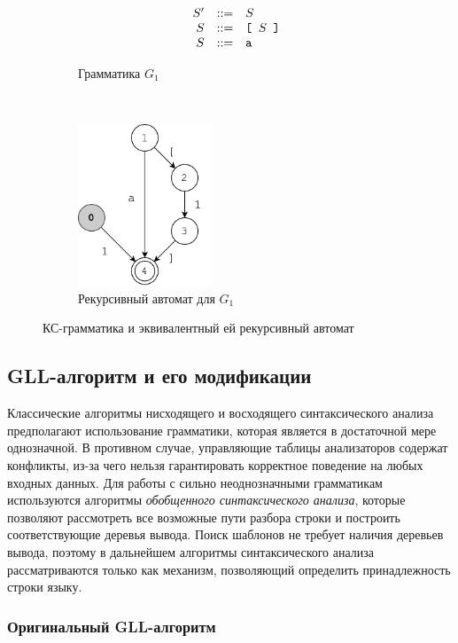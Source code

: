 \begin{figure}[h]
	\centering
	\begin{subfigure}[b]{0.45\textwidth}
		\centering
		$$
		\begin{array}{crcl}
		&S' & ::= & S \\
		&S  & ::= & \texttt{[ } S \texttt{ ]}\\
		&S  & ::= & \mbox{\texttt{a}}
		\end{array}
		$$
		\caption{Грамматика $G_1$}
	\end{subfigure}
	~
	\begin{subfigure}[b]{0.45\textwidth}
		\centering
		\includegraphics[width=4cm]{pictures/ra_example.pdf}
		\caption{Рекурсивный автомат для $G_1$}
	\end{subfigure}
	\caption{КС-грамматика и эквивалентный ей рекурсивный автомат}
	\label{fig:ra_ex}
\end{figure}

\subsection{GLL-алгоритм и его модификации}

Классические алгоритмы нисходящего и восходящего синтаксического анализа предполагают использование грамматики, которая является в достаточной мере однозначной. 
В противном случае, управляющие таблицы анализаторов содержат конфликты, из-за чего нельзя гарантировать корректное поведение на любых входных данных. 
Для работы с сильно неоднозначными грамматикам используются алгоритмы \textit{обобщенного синтаксического анализа}, которые позволяют рассмотреть все возможные пути разбора строки и построить соответствующие деревья вывода.
Поиск шаблонов не требует наличия деревьев вывода, поэтому в дальнейшем алгоритмы синтаксического анализа рассматриваются только как механизм, позволяющий определить принадлежность строки языку.

\subsubsection{Оригинальный GLL-алгоритм}

